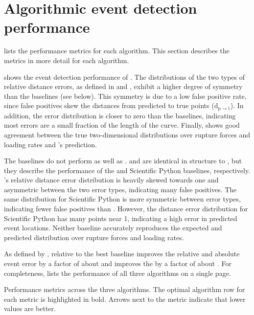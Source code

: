 \section{Algorithmic event detection performance}

 lists the performance metrics for each algorithm. This section describes the metrics in more detail for each algorithm. 

 shows the event detection performance of \name{}. The distributions of the two types of relative distance errors, as defined in  and , exhibit a higher degree of symmetry than the baselines (see below). This symmetry is due to a low false positive rate, since false positives skew the distances from predicted to true points (d$_{\mathrm{p}\rightarrow\mathrm{t}}$). In addition, the error distribution is closer to zero than the baselines, indicating most errors are a small fraction of the length of the curve. Finally,  shows good agreement between the true two-dimensional distributions over rupture forces and loading rates and \name{}'s prediction.

The baselines do not perform as well as \name{}.  and  are identical in structure to , but they describe the performance of the \OpenFovea{} and Scientific Python baselines, respectively. \OpenFovea{}'s relative distance error distribution is heavily skewed towards one and asymmetric between the two error types, indicating many false positives. The same distribution for Scientific Python is more symmetric between error types, indicating fewer false positives than \OpenFovea{}. However, the distance error distribution for Scientific Python has many points near 1, indicating a high error in predicted event locations. Neither baseline accurately reproduces the expected and predicted distribution over rupture forces and loading rates.

As defined by , relative to the best baseline \name{} improves the relative and absolute event error by a factor of about \DistErrorI{} and improves the \BccLong{} by a factor of about \bccI{}. For completeness,  lists the performance of all three algorithms on a single page.

\begin{table}
\caption[Algorithm performance]{ Performance metrics across the three algorithms. The optimal algorithm row for each metric is highlighted in bold. Arrows next to the metric indicate that lower values are better.}

\end{table}




